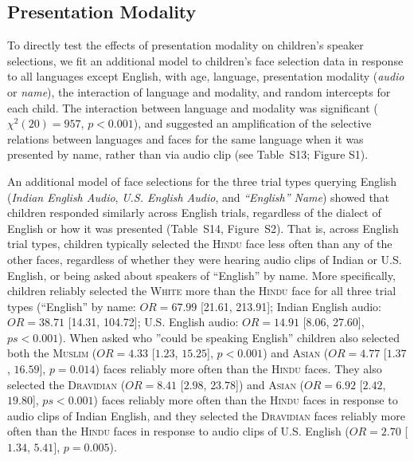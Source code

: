 \documentclass{foushee-adapted-preprint}
\newcommand{\facemodalitytab}{S13}
\newcommand{\faceenglishmodalitytab}{S14}
\newcommand{\nonengbarplot}{S1}
\newcommand{\engbarplot}{S2}
\begin{document}
\subsection{Presentation Modality}
To directly test the effects of presentation modality on children's speaker selections, we fit an additional model to children's face selection data in response to all languages except English, with age, language, presentation modality (\textit{audio} or \textit{name}), the interaction of language and modality, and random intercepts for each child. The interaction between language and modality was significant ($\chi^2(20)=957$, $p<0.001$), and suggested an amplification of the selective relations between languages and faces for the same language when it was presented by name, rather than via audio clip (see Table~\facemodalitytab; Figure \nonengbarplot).

An additional model of face selections for the three trial types querying English (\textit{Indian English Audio}, \textit{U.S. English Audio}, and \textit{``English'' Name}) showed that children responded similarly across English trials, regardless of the dialect of English or how it was presented (Table~\faceenglishmodalitytab, Figure~\engbarplot). 
That is, across English trial types, children typically selected the \textsc{Hindu} face less often than any of the other faces, regardless of whether they were hearing audio clips of Indian or U.S. English, or being asked about speakers of ``English'' by name. 
More specifically, children reliably selected the \textsc{White} more than the \textsc{Hindu} face for all three trial types (``English'' by name: $OR=67.99$ [21.61, 213.91]; Indian English audio: $OR=38.71$ [14.31, 104.72]; U.S. English audio: $OR=14.91$ [8.06, 27.60], $ps<0.001$). 
When asked who ''could be speaking English'' children also selected both the \textsc{Muslim} ($OR=4.33$ [$1.23$, $15.25$], $p<0.001$) and \textsc{Asian} ($OR=4.77$ [$1.37$, $16.59$], $p=0.014$) faces reliably more often than the \textsc{Hindu} faces. 
They also selected the \textsc{Dravidian} ($OR=8.41$ [$2.98$, $23.78$]) and \textsc{Asian} ($OR=6.92$ [$2.42$, $19.80$], $ps<0.001$) faces reliably more often than the \textsc{Hindu} faces in response to audio clips of Indian English, and they  selected the \textsc{Dravidian} faces reliably more often than the \textsc{Hindu} faces in response to audio clips of U.S. English ($OR=2.70$ [$1.34$, $5.41$], $p=0.005$).
\end{document}
